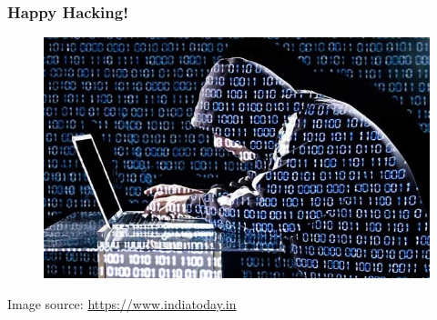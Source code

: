 \documentclass[screen, aspectratio=43]{beamer}
\begin{document}
%
\begin{frame}
  \frametitle{Happy Hacking!}
    \begin{figure}
	\includegraphics[scale=0.3]{img/ethical-hacking.jpg}
    \end{figure}	
    {\tiny Image source: \url{https://www.indiatoday.in}}
\end{frame}
%
\end{document}
